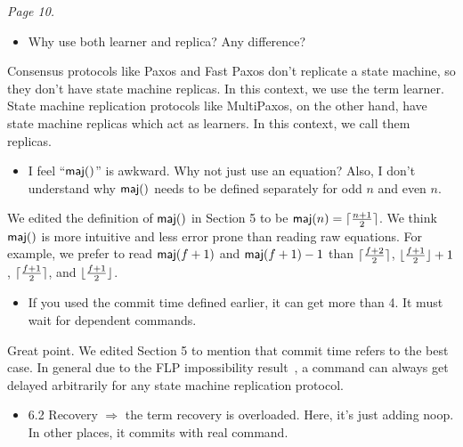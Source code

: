 \documentclass[letterpaper,twocolumn,10pt]{article}
\newenvironment{reviewerquote}
{\list{}{\leftmargin=\parindent\rightmargin=0in}\item[] \itshape \color{ReviewerDarkGray}}%
{\endlist}
\begin{document}
\begin{reviewerquote}
  Page 10.

  \begin{itemize}
    \item
      Why use both learner and replica? Any difference?
  \end{itemize}
\end{reviewerquote}

Consensus protocols like Paxos and Fast Paxos don't replicate a state machine,
so they don't have state machine replicas. In this context, we use the term
learner. State machine replication protocols like MultiPaxos, on the other
hand, have state machine replicas which act as learners. In this context, we
call them replicas.

\begin{reviewerquote}
  \begin{itemize}
    \item
      I feel ``$\textsf{maj}()$'' is awkward. Why not just use an equation? Also, I
      don't understand why $\textsf{maj}()$ needs to be defined separately for odd $n$
      and even $n$.
  \end{itemize}
\end{reviewerquote}

We edited the definition of $\textsf{maj}()$ in Section 5 to be $\textsf{maj}(n) =
\lceil\frac{n+1}{2}\rceil$. We think $\textsf{maj}()$ is more intuitive and less error prone
than reading raw equations. For example, we prefer to read $\textsf{maj}(f+1)$ and
$\textsf{maj}(f+1) - 1$ than $\lceil\frac{f+2}{2}\rceil$, $\lfloor\frac{f+1}{2}\rfloor + 1$,
$\lceil\frac{f+1}{2}\rceil$, and $\lfloor\frac{f+1}{2}\rfloor$.

\begin{reviewerquote}
  \begin{itemize}
    \item
      If you used the commit time defined earlier, it can get more than 4. It
      must wait for dependent commands.
  \end{itemize}
\end{reviewerquote}

Great point. We edited Section 5 to mention that commit time refers to the best
case. In general due to the FLP impossibility
result~\cite{fischer1982impossibility}, a command can always get delayed
arbitrarily for any state machine replication protocol.

\begin{reviewerquote}
  \begin{itemize}
    \item
      6.2 Recovery $\Rightarrow$ the term recovery is overloaded. Here, it's
      just adding noop. In other places, it commits with real command.
  \end{itemize}
\end{reviewerquote}
\end{document}
